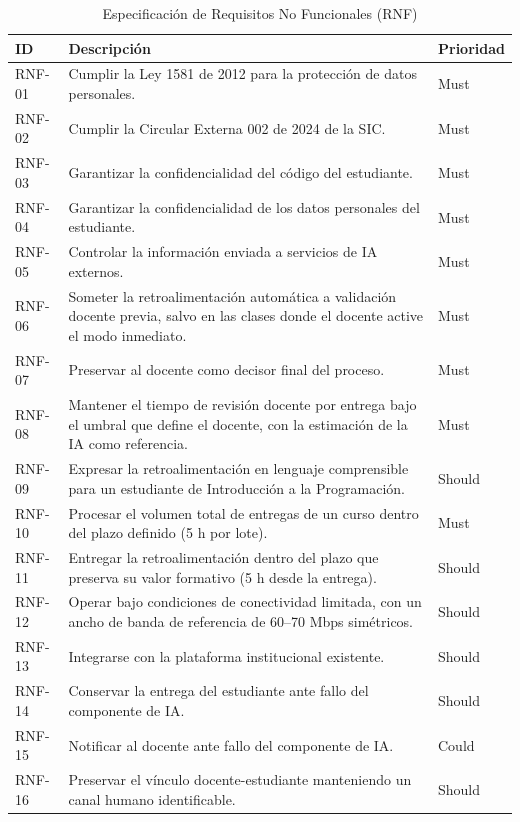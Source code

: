 \documentclass[letterpaper, 10 pt, conference]{ieeeconf}
\begin{document}
\begin{table}[ht]
	\centering
	\caption{Especificación de Requisitos No Funcionales (RNF)}
	\label{tab:req_nofuncional}
	\begin{tabular}{lp{5.0cm}l}
		\hline
		\textbf{ID} & \textbf{Descripción} & \textbf{Prioridad} \\
		\hline
		RNF-01 & Cumplir la Ley 1581 de 2012 para la protección de datos personales. & Must \\
		RNF-02 & Cumplir la Circular Externa 002 de 2024 de la SIC. & Must \\
		RNF-03 & Garantizar la confidencialidad del código del estudiante. & Must \\
		RNF-04 & Garantizar la confidencialidad de los datos personales del estudiante. & Must \\
		RNF-05 & Controlar la información enviada a servicios de IA externos. & Must \\
		RNF-06 & Someter la retroalimentación automática a validación docente previa, salvo en las clases donde el docente active el modo inmediato. & Must \\
		RNF-07 & Preservar al docente como decisor final del proceso. & Must \\
		RNF-08 & Mantener el tiempo de revisión docente por entrega bajo el umbral que define el docente, con la estimación de la IA como referencia. & Must \\
		RNF-09 & Expresar la retroalimentación en lenguaje comprensible para un estudiante de Introducción a la Programación. & Should \\
		RNF-10 & Procesar el volumen total de entregas de un curso dentro del plazo definido (5 h por lote). & Must \\
		RNF-11 & Entregar la retroalimentación dentro del plazo que preserva su valor formativo (5 h desde la entrega). & Should \\
		RNF-12 & Operar bajo condiciones de conectividad limitada, con un ancho de banda de referencia de 60--70 Mbps simétricos. & Should \\
		RNF-13 & Integrarse con la plataforma institucional existente. & Should \\
		RNF-14 & Conservar la entrega del estudiante ante fallo del componente de IA. & Should \\
		RNF-15 & Notificar al docente ante fallo del componente de IA. & Could \\
		RNF-16 & Preservar el vínculo docente-estudiante manteniendo un canal humano identificable. & Should \\
		\hline
	\end{tabular}
\end{table}
\end{document}
